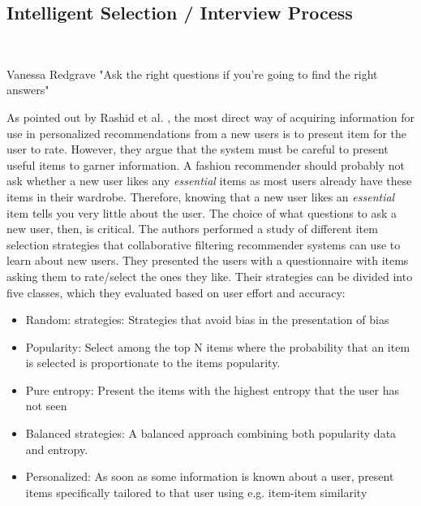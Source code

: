 \subsection{Intelligent Selection / Interview Process}\mbox{}\\

\begin{chapquote}[30pt]{Vanessa Redgrave}
  "Ask the right questions if you're going to find the right answers"
\end{chapquote}


As pointed out by Rashid et al. \cite{Rashid2002}, the most direct way of
acquiring information for use in personalized recommendations from a new users
is to present item for the user to rate. However, they argue that the system
must be careful to present useful items to garner information. A fashion
recommender should probably not ask whether a new user likes any \emph{essential}
items as most users already have these items in their wardrobe. Therefore, knowing
that a new user likes an \emph{essential} item tells you very little about
the user. The choice of what questions to ask a new user, then, is critical.
The authors performed a study of different item selection strategies that collaborative
filtering recommender systems can use to learn about new users. They presented the users
with a questionnaire with items asking them to rate/select the ones they like.
Their strategies can be divided into five classes, which they evaluated based
on user effort and accuracy:

\begin{itemize}
\item Random: strategies: Strategies that avoid bias in the presentation
	  of bias
\item Popularity: Select among the top N items where the probability
	  that an item is selected is proportionate to the items popularity.
\item Pure entropy: Present the items with the highest entropy that the
	  user has not seen
\item Balanced strategies: A balanced approach combining both popularity
	  data and entropy.
\item Personalized: As soon as some information is known about a user,
	  present items specifically tailored to that user using e.g. item-item
	  similarity
\end{itemize}

